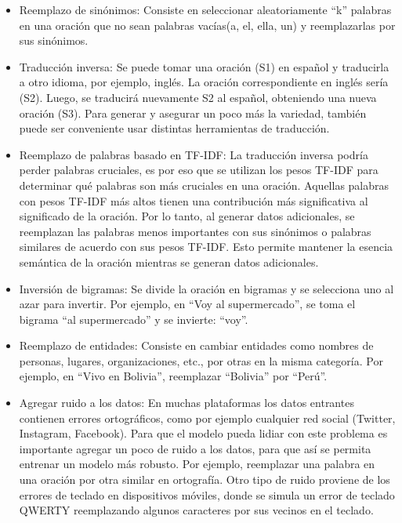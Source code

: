 \begin{itemize}

	\item Reemplazo de sinónimos: Consiste en seleccionar aleatoriamente ``k'' palabras en una oración que no sean palabras vacías(a, el, ella, un) y reemplazarlas por sus sinónimos.
	
	\item Traducción inversa: Se puede tomar una oración (S1) en español y traducirla a otro idioma, por ejemplo, inglés.  La oración correspondiente en inglés sería (S2). Luego, se traducirá nuevamente S2 al español, obteniendo una nueva oración (S3). Para generar y asegurar un poco más la variedad, también puede ser conveniente usar distintas herramientas de traducción.
	
	\item Reemplazo de palabras basado en TF-IDF: La traducción inversa podría perder palabras cruciales, es por eso que se utilizan los pesos TF-IDF para determinar qué palabras son más cruciales en una oración. Aquellas palabras con pesos TF-IDF más altos tienen una contribución más significativa al significado de la oración. Por lo tanto, al generar datos adicionales, se reemplazan las palabras menos importantes con sus sinónimos o palabras similares de acuerdo con sus pesos TF-IDF. Esto permite mantener la esencia semántica de la oración mientras se generan datos adicionales.
	
	\item Inversión de bigramas: Se divide la oración en bigramas y se selecciona uno al azar para invertir. Por ejemplo, en ``Voy al supermercado'', se toma el bigrama ``al supermercado'' y se invierte: ``voy''.
	
	\item Reemplazo de entidades: Consiste en cambiar entidades como nombres de personas, lugares, organizaciones, etc., por otras en la misma categoría. Por ejemplo, en ``Vivo en Bolivia'', reemplazar ``Bolivia'' por ``Perú''.
	
	\item Agregar ruido a los datos: En muchas plataformas los datos entrantes contienen errores ortográficos, como por ejemplo cualquier red social (Twitter, Instagram, Facebook). Para que el modelo pueda lidiar con este problema es importante agregar un poco de ruido a los datos, para que así se permita entrenar un modelo más robusto. Por ejemplo, reemplazar una palabra en una oración por otra similar en ortografía. Otro tipo de ruido proviene de los errores de teclado en dispositivos móviles, donde se simula un error de teclado QWERTY reemplazando algunos caracteres por sus vecinos en el teclado.


\end{itemize}
